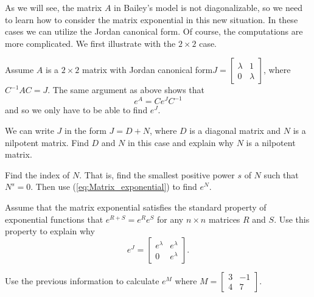 As we will see, the matrix $A$ in Bailey's model is not diagonalizable, so we need to learn how to consider the matrix exponential in this new situation. In these cases we can utilize the Jordan canonical form. Of course, the computations are more complicated. We first illustrate with the $2 \times 2$ case. 

\begin{pactivity} Assume $A$ is a $2 \times 2$ matrix with Jordan canonical form$J = \left[ \begin{array}{cc} \lambda&1\\0&\lambda \end{array} \right]$, where $C^{-1}AC = J$. The same argument as above shows that  
\[e^A = Ce^JC^{-1}\]
and so we only have to be able to find $e^J$. 
\ba
\item We can write $J$ in the form $J = D+N$, where $D$ is a diagonal matrix and $N$ is a nilpotent matrix. Find $D$ and $N$ in this case and explain why $N$ is a nilpotent matrix.

\item Find the index of $N$. That is, find the smallest positive power $s$ of $N$ such that $N^s = 0$. Then use (\ref{eq:Matrix_exponential}) to find $e^N$. 

\item Assume that the matrix exponential satisfies the standard property of exponential functions that $e^{R+S} = e^Re^S$ for any $n \times n$ matrices $R$ and $S$. Use this property to explain why
\[e^J = \left[ \begin{array}{cc} e^{\lambda}&e^{\lambda}\\0&e^{\lambda} \end{array} \right].\]

\item Use the previous information to calculate $e^M$ where $M = \left[ \begin{array}{cr} 3 &-1 \\ 4 & 7 \end{array} \right]$. 

\ea

\end{pactivity}



